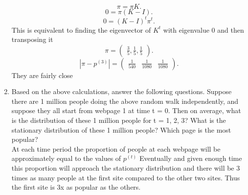 \documentclass{article}
\begin{document}
\begin{enumerate}
    \[
    \pi = \pi K .\] \[ 0 = \pi (K-I)
    .\] 
    \[
    0 = (K-I)^t \pi^t
    .\]
    This is equivalent to finding the eigenvector of $K^t$ with eigenvalue 0 and then transposing it
    \[
    \pi =
    \begin{pmatrix}
        \frac{3}{5}, \frac{1}{5}, \frac{1}{5}
    \end{pmatrix}
    .\] 
    \[
    |\pi - p^{(3)}| =
\begin{pmatrix}
    \frac{1}{540} & \frac{1}{1080} & \frac{1}{1080}
\end{pmatrix}
    .\] They are fairly close
\item 
    Based on the above calculations, answer the following questions. Suppose there are 1 million
people doing the above random walk independently, and suppose they all start from webpage 1
at time t = 0. Then on average, what is the distribution of these 1 million people for t = 1, 2, 3?
What is the stationary distribution of these 1 million people? Which page is the most popular?\\
At each time period the proportion of people at each webpage will be approximately equal to the values of $p^{(t)}$ 
Eventually and given enough time this proportion will approach the stationary distribution and there will be 3 times as many people
at the first site compared to the other two sites. Thus the first site is 3x as popular as the others.
    \end{enumerate}
\end{document}
